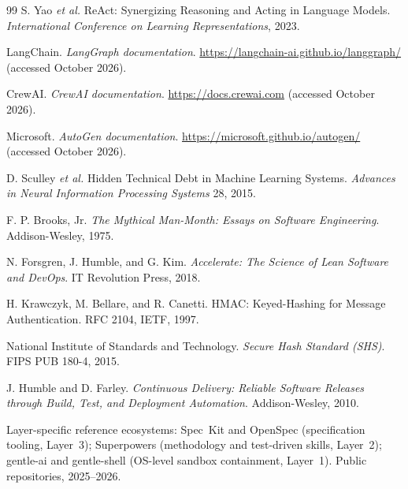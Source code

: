 \documentclass[10pt,a4paper]{article}
\theoremstyle{definition}
\theoremstyle{plain}
\theoremstyle{principle}
\begin{document}
\begin{thebibliography}{99}
S. Yao \emph{et al.} ReAct: Synergizing Reasoning and Acting in Language Models.
\emph{International Conference on Learning Representations}, 2023.

LangChain. \emph{LangGraph documentation}. \url{https://langchain-ai.github.io/langgraph/}
(accessed October 2026).

CrewAI. \emph{CrewAI documentation}. \url{https://docs.crewai.com} (accessed October 2026).

Microsoft. \emph{AutoGen documentation}. \url{https://microsoft.github.io/autogen/}
(accessed October 2026).

D. Sculley \emph{et al.} Hidden Technical Debt in Machine Learning Systems.
\emph{Advances in Neural Information Processing Systems} 28, 2015.

F. P. Brooks, Jr. \emph{The Mythical Man-Month: Essays on Software Engineering}.
Addison-Wesley, 1975.

N. Forsgren, J. Humble, and G. Kim. \emph{Accelerate: The Science of Lean Software and DevOps}.
IT Revolution Press, 2018.

H. Krawczyk, M. Bellare, and R. Canetti. HMAC: Keyed-Hashing for Message Authentication.
RFC 2104, IETF, 1997.

National Institute of Standards and Technology. \emph{Secure Hash Standard (SHS)}.
FIPS PUB 180-4, 2015.

J. Humble and D. Farley. \emph{Continuous Delivery: Reliable Software Releases through Build,
Test, and Deployment Automation}. Addison-Wesley, 2010.

Layer-specific reference ecosystems: Spec~Kit and OpenSpec (specification tooling, Layer~3);
Superpowers (methodology and test-driven skills, Layer~2); gentle-ai and gentle-shell (OS-level
sandbox containment, Layer~1). Public repositories, 2025--2026.

\end{thebibliography}
\end{document}
